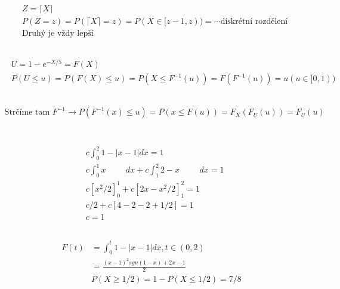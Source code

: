 \documentclass[a4paper]{article}
\newcommand{\tab}{\hspace{1cm}}
\begin{document}
\subsection{}
\begin{align*}
& Z = \lceil X \rceil \\
& P(Z = z) = P(\lceil X \rceil = z) = P(X \in [z-1, z)) = \cdots \text{diskrétní rozdělení} \\
& \text{Druhý je vždy lepší}
\end{align*}

\subsection{}
\begin{align*}
& U=1 - e^{-X/5} = F(X) \\
& P(U \le u) = P(F(X) \le u) = P(X \le F^{-1}(u)) = F(F^{-1}(u)) = u (u \in [0,1))
\end{align*}

\subsection{}
\begin{align*}
\text{Strčíme tam } F^{-1} \rightarrow P(F^{-1}(x) \le u) = P(x \le F(u)) = F_X(F_U(u)) = F_U(u)
\end{align*}

\section{}
\subsection{}
\begin{align*}
& c \int_0^2 1 - |x-1| dx = 1 \\
& c \int_0^1 x\tab dx + c \int_1^2 2  -x\tab dx = 1\\
& c[x^2/2]_0^1 + c[2x -x^2/2]_1^2 = 1 \\
& c/2 + c[4 - 2 - 2 + 1/2] = 1 \\
& c = 1
\end{align*}

\subsection{}
\begin{align*}
F(t) &= \int_0^t 1 - |x-1| dx, t \in (0,2) \\
&= \frac{(x-1)^2 sgn(1-x) + 2x -1}{2} \\
&P(X \ge 1/2) = 1 - P(X \le 1/2) = 7/8
\end{align*}
\end{document}
